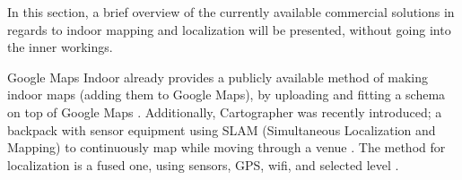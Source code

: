 In this section, a brief overview of the currently available commercial solutions in regards to indoor mapping and localization will be presented, without going into the inner workings.

Google Maps Indoor already provides a publicly available method of making indoor maps (adding them to Google Maps), by uploading and fitting a schema on top of Google Maps \cite{google_maps_indoor}.
Additionally, Cartographer was recently introduced; a backpack with sensor equipment using SLAM (Simultaneous Localization and Mapping) to continuously map while moving through a venue \cite{cartographer}.
The method for localization is a fused one, using sensors, GPS, wifi, and selected level \cite[Slide 45]{indoor_maps_google_slides}.


